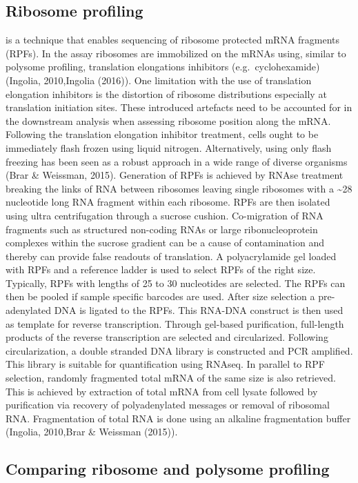 \documentclass[12pt,openany]{book}
\begin{document}
\subsection{Ribosome profiling} \label{riboseq}

is a technique that enables sequencing of ribosome protected mRNA
fragments (RPFs). In the assay ribosomes are immobilized on the mRNAs
using, similar to polysome profiling, translation elongations inhibitors
(e.g.~cyclohexamide) (Ingolia, 2010,Ingolia (2016)). One limitation with
the use of translation elongation inhibitors is the distortion of
ribosome distributions especially at translation initiation sites. These
introduced artefacts need to be accounted for in the downstream analysis
when assessing ribosome position along the mRNA. Following the
translation elongation inhibitor treatment, cells ought to be
immediately flash frozen using liquid nitrogen. Alternatively, using
only flash freezing has been seen as a robust approach in a wide range
of diverse organisms (Brar \& Weissman, 2015). Generation of RPFs is
achieved by RNAse treatment breaking the links of RNA between ribosomes
leaving single ribosomes with a \textasciitilde{}28 nucleotide long RNA
fragment within each ribosome. RPFs are then isolated using ultra
centrifugation through a sucrose cushion. Co-migration of RNA fragments
such as structured non-coding RNAs or large ribonucleoprotein complexes
within the sucrose gradient can be a cause of contamination and thereby
can provide false readouts of translation. A polyacrylamide gel loaded
with RPFs and a reference ladder is used to select RPFs of the right
size. Typically, RPFs with lengths of 25 to 30 nucleotides are selected.
The RPFs can then be pooled if sample specific barcodes are used. After
size selection a pre-adenylated DNA is ligated to the RPFs. This RNA-DNA
construct is then used as template for reverse transcription. Through
gel-based purification, full-length products of the reverse
transcription are selected and circularized. Following circularization,
a double stranded DNA library is constructed and PCR amplified. This
library is suitable for quantification using RNAseq. In parallel to RPF
selection, randomly fragmented total mRNA of the same size is also
retrieved. This is achieved by extraction of total mRNA from cell lysate
followed by purification via recovery of polyadenylated messages or
removal of ribosomal RNA. Fragmentation of total RNA is done using an
alkaline fragmentation buffer (Ingolia, 2010,Brar \& Weissman (2015)).

\subsection{Comparing ribosome and polysome profiling}
\end{document}
